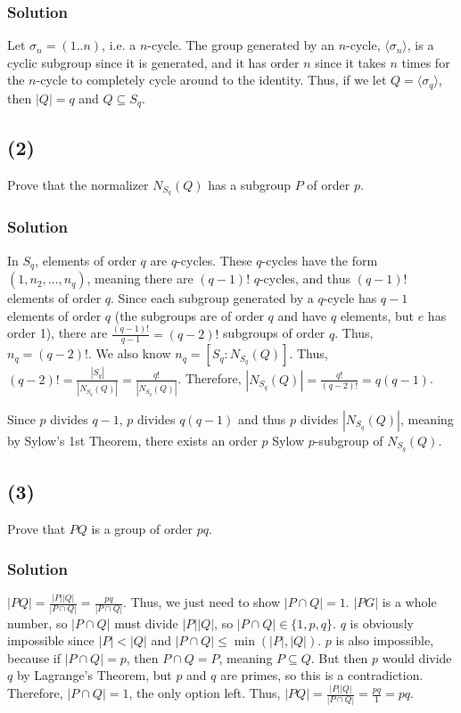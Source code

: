 \documentclass[fleqn]{article}
\begin{document}
            \subsubsection{Solution}
            Let $\sigma_n = (1..n)$, i.e. a $n$-cycle.  The group generated by an $n$-cycle, $\langle \sigma_n \rangle$, is a cyclic subgroup since it is generated, and it has order $n$ since it takes $n$ times for the $n$-cycle to completely cycle around to the identity.  Thus, if we let $Q = \langle \sigma_q \rangle$, then $|Q| = q$ and $Q \subseteq S_q$.
        
        \pagebreak
        
        \subsection{(2)}
        Prove that the normalizer $N_{S_q}(Q)$ has a subgroup $P$ of order $p$.
            
            \subsubsection{Solution}
            In $S_q$, elements of order $q$ are $q$-cycles.  These $q$-cycles have the form $(1, n_2, ..., n_q)$, meaning there are $(q - 1)!$ $q$-cycles, and thus $(q - 1)!$ elements of order $q$.  Since each subgroup generated by a $q$-cycle has $q - 1$ elements of order $q$ (the subgroups are of order $q$ and have $q$ elements, but $e$ has order 1), there are $\frac{(q - 1)!}{q - 1} = (q - 2)!$ subgroups of order $q$.  Thus, $n_q = (q - 2)!$.  We also know $n_q = [S_q : N_{S_q}(Q)]$.  Thus, $(q - 2)! = \frac{|S_q|}{|N_{S_q}(Q)|} = \frac{q!}{|N_{S_q}(Q)|}$.  Therefore, $|N_{S_q}(Q)| = \frac{q!}{(q - 2)!} = q(q - 1)$.  
            
            Since $p$ divides $q - 1$, $p$ divides $q(q - 1)$ and thus $p$ divides $|N_{S_q}(Q)|$, meaning by Sylow's 1st Theorem, there exists an order $p$ Sylow $p$-subgroup of $N_{S_q}(Q)$.
        
        \subsection{(3)}
        Prove that $PQ$ is a group of order $pq$.
            
            \subsubsection{Solution}
            $|PQ| = \frac{|P||Q|}{|P \cap Q|} = \frac{pq}{|P \cap Q|}$.  Thus, we just need to show $|P \cap Q| = 1$.  $|PG|$ is a whole number, so $|P \cap Q|$ must divide $|P||Q|$, so $|P \cap Q| \in \{1, p, q\}$.  $q$ is obviously impossible since $|P| < |Q|$ and $|P \cap Q| \leq \min(|P|, |Q|)$.  $p$ is also impossible, because if $|P \cap Q| = p$, then $P \cap Q = P$, meaning $P \subseteq Q$.  But then $p$ would divide $q$ by Lagrange's Theorem, but $p$ and $q$ are primes, so this is a contradiction.  Therefore, $|P \cap Q| = 1$, the only option left.  Thus, $|PQ| = \frac{|P||Q|}{|P \cap Q|} = \frac{pq}{1} = pq$.
        
\end{document}
